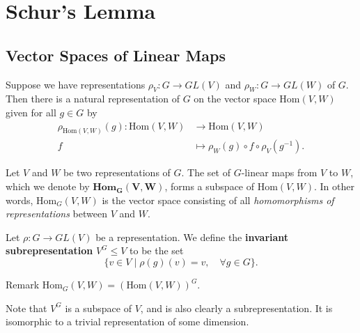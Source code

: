 \section{Schur's Lemma}
\subsection{Vector Spaces of Linear Maps}

\begin{frame}
\begin{proposition}
Suppose we have representations $\rho_V \colon G \to GL(V)$ and $\rho_W \colon G \to GL(W)$ of $G$. Then there is a natural representation of $G$ on the vector space $\text{Hom}(V,W)$ given for all $g \in G$ by
\begin{align*}		
 \rho_{\text{Hom}(V,W)}(g)  \colon \text{Hom}(V,W) &\to \text{Hom}(V,W) \\		
 f &\mapsto \rho_{W}(g) \circ f \circ \rho_{V}(g^{-1}).
 \end{align*}		
\end{proposition}		
\end{frame}

\begin{frame}
\begin{definition}		
Let $V$ and $W$ be two representations of $G$.  The set of $G$-linear maps from $V$ to $W$, which we denote by $\textbf{Hom}_\mathbf{G}\mathbf{(V,W)}$, forms a subspace of $\text{Hom}(V,W)$.  In other words, $\text{Hom}_{G}(V,W)$ is the vector space consisting of all \textit{homomorphisms of representations} between $V$ and $W$. 
\end{definition} 

\begin{definition}
Let $\rho \colon G \to GL(V)$ be a representation.  We define the \textbf{invariant subrepresentation} $V^G \leq V$ to be the set 
\[ \{ v \in V  \mid \rho(g)(v) = v,  \quad \forall g \in G \}. \]
\end{definition}

\begin{block}{Remark}
$\text{Hom}_G(V,W) = ( \text{Hom} (V,W) )^G $.
\end{block}
\end{frame}
\begin{note}
Note that $V^G$ is a subspace of $V$, and is also clearly a subrepresentation.   It is isomorphic to a trivial representation of some dimension.
\end{note}


